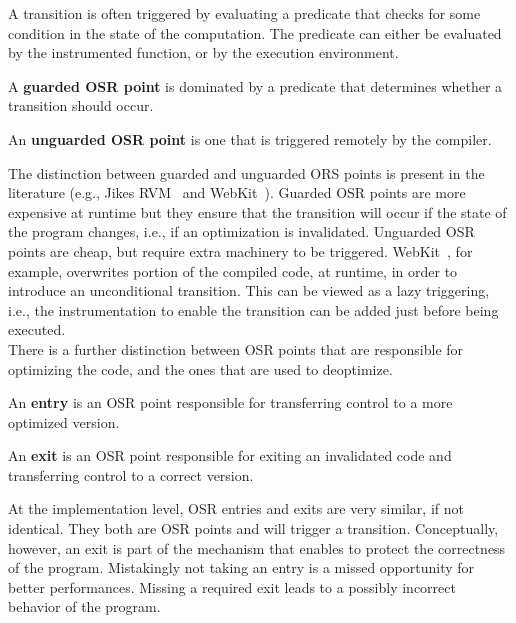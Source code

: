 A transition is often triggered by evaluating a predicate that checks for 
some condition in the state of the computation.
The predicate can either be evaluated by the instrumented function, or by the execution environment.

\begin{definition}
A {\bf guarded OSR point} is dominated by a predicate that determines
whether a transition should occur.
\end{definition}

\begin{definition}
An {\bf unguarded OSR point} is one that is triggered remotely by the compiler.
\end{definition}

The distinction between guarded and unguarded ORS points is present in the
literature (e.g., Jikes RVM~\cite{fink2003design, soman2006efficient} and
WebKit~\cite{WebKitURL}).  Guarded OSR points are more expensive at runtime
but they ensure that the transition will occur if the state of the program
changes, i.e., if an optimization is invalidated.  Unguarded OSR points are
cheap, but require extra machinery to be triggered.  WebKit~\cite{WebKitURL}, for
example, overwrites portion of the compiled code, at runtime, in order to
introduce an unconditional transition.  This can be viewed as a lazy
triggering, i.e., the instrumentation to enable the transition can be added
just before being executed.\\

There is a further distinction between OSR points that are responsible for
optimizing the code, and the ones that are used to deoptimize.

\begin{definition}\label{OSREntryDefinition}
An {\bf entry} is an OSR point responsible for transferring control to a more optimized version.
\end{definition}

\begin{definition}
An {\bf exit} is an OSR point responsible for exiting an invalidated code and transferring control to a correct version.
\end{definition}

At the implementation level, OSR entries and exits are very similar, if not
identical.  They both are OSR points and will trigger a transition.
Conceptually, however, an exit is part of the mechanism that enables to
protect the correctness of the program.  Mistakingly not taking an entry is
a missed opportunity for better performances.  Missing a required exit leads
to a possibly incorrect behavior of the program.

